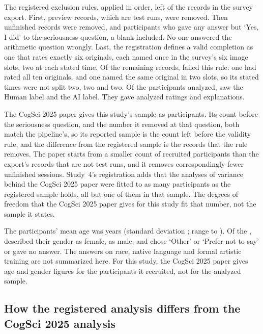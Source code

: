 The registered exclusion rules, applied in order, left \SFourN{} of the \SFourNRecords{} records in the survey export. First, \SFourNPreviewRemoved{} preview records, which are test runs, were removed. Then \SFourNUnfinishedRemoved{} unfinished records were removed, and \SFourNNotSeriousRemoved{} participants who gave any answer but `Yes, I did' to the seriousness question, a blank included. No one answered the arithmetic question wrongly. Last, the registration defines a valid completion as one that rates exactly six originals, each named once in the survey's six image slots, two at each stated time. Of the remaining records, \SFourNInvalidRemoved{} failed this rule: one had rated all ten originals, and one named the same original in two slots, so its stated times were not split two, two and two. Of the \SFourN{} participants analyzed, \SFourNHuman{} saw the Human label and \SFourNAI{} the AI label. They gave \SFourNRatings{} analyzed ratings and \SFourNJustifications{} explanations.

The CogSci 2025 paper gives this study's sample as \SFourNBeforeValidity{} participants. Its count before the seriousness question, and the number it removed at that question, both match the pipeline's, so its reported sample is the count left before the validity rule, and the difference from the registered sample is the \SFourNInvalidRemoved{} records that the rule removes. The paper starts from a smaller count of recruited participants than the export's records that are not test runs, and it removes correspondingly fewer unfinished sessions. Study~4's registration adds that the analyses of variance behind the CogSci 2025 paper were fitted to as many participants as the registered sample holds, all but one of them in that sample. The degrees of freedom that the CogSci 2025 paper gives for this study fit that number, not the sample it states.

The participants' mean age was \SFourAgeMean{} years (standard deviation \SFourAgeSD; range \SFourAgeMin{} to \SFourAgeMax). Of the \SFourN, \SFourNWomen{} described their gender as female, \SFourNMen{} as male, and \SFourNGenderOther{} chose `Other' or `Prefer not to say' or gave no answer. The answers on race, native language and formal artistic training are not summarized here. For this study, the CogSci 2025 paper gives age and gender figures for the participants it recruited, not for the analyzed sample.

\subsection*{How the registered analysis differs from the CogSci 2025 analysis}

